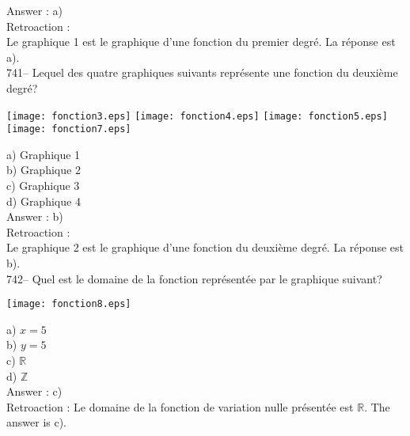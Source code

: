 ﻿\documentclass[letterpaper, 12pt]{article}
\begin{document}
Answer : a)\\

Retroaction : \\
Le graphique 1 est le graphique d'une fonction du premier degr\'e.  La
r\'eponse est a).\\

741-- Lequel des quatre graphiques suivants repr\'esente une fonction du
deuxi\`eme degr\'e?\\
    \begin{center}
    \texttt{[image: fonction3.eps]}
\texttt{[image: fonction4.eps]}
\texttt{[image: fonction5.eps]}
\texttt{[image: fonction7.eps]}

    \end{center}
a) Graphique 1\\
b) Graphique 2\\
c) Graphique 3\\
d) Graphique 4\\

Answer : b)\\

Retroaction : \\
Le graphique 2 est le graphique d'une fonction du deuxi\`eme degr\'e.  La
r\'eponse est b).\\

742-- Quel est le domaine de la fonction repr\'esent\'ee par le graphique
suivant?

    \begin{center}
    \texttt{[image: fonction8.eps]}
    \end{center}
a) $x=5$\\
b) $y=5$\\
c) $\mathbb{R}$\\
d) $\mathbb{Z}$\\

Answer : c)\\

Retroaction :
Le domaine de la fonction de variation nulle pr\'esent\'ee est $\mathbb{R}$.
  The answer is c).\\
\end{document}
